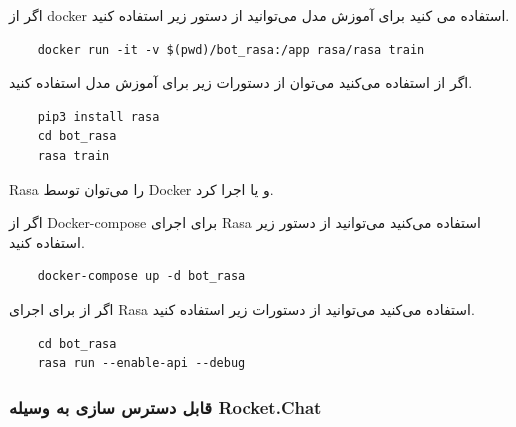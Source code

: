 اگر از docker استفاده می کنید برای آموزش مدل می‌توانید از دستور زیر استفاده کنید.

\begin{latin}
    \begin{verbatim}
    docker run -it -v $(pwd)/bot_rasa:/app rasa/rasa train
    \end{verbatim}
\end{latin}

اگر از  استفاده می‌کنید می‌توان از دستورات زیر برای آموزش مدل استفاده کنید.

\begin{latin}
    \begin{verbatim}
    pip3 install rasa
    cd bot_rasa
    rasa train
    \end{verbatim}
\end{latin}

Rasa را می‌توان توسط Docker و یا  اجرا کرد.

اگر از Docker-compose برای اجرای Rasa استفاده می‌کنید می‌توانید از دستور زیر استفاده کنید. 

\begin{latin}
    \begin{verbatim}
    docker-compose up -d bot_rasa
    \end{verbatim}
\end{latin}

اگر از  برای اجرای Rasa استفاده می‌کنید می‌توانید از دستورات زیر استفاده کنید.  

\begin{latin}
    \begin{verbatim}
    cd bot_rasa
    rasa run --enable-api --debug
    \end{verbatim}
\end{latin}

\subsubsection{قابل دسترس سازی  به وسیله Rocket.Chat}


